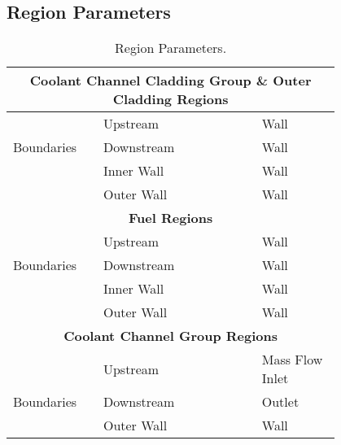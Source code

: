 \documentclass[8pt,a5paper]{article}
\begin{document}
\subsection*{Region Parameters}

\vspace{-0.25in}

\begin{table}[h!]
    \label{table: Table 5}
    \centering
    \small
    \caption{Region Parameters.}
    \begin{tabular}{|m{0.2\linewidth}|m{0.4\linewidth}|m{0.2\linewidth}|}
    \hline
    \multicolumn{3}{|c|}{\textbf{Coolant Channel Cladding Group \& Outer Cladding Regions}}\\\hline
    & Upstream & Wall\\\cline{2-3}
    Boundaries & Downstream & Wall\\\cline{2-3}
    & Inner Wall & Wall\\\cline{2-3}
    & Outer Wall & Wall\\\hline
    \multicolumn{3}{|c|}{\textbf{Fuel Regions}}\\\hline
    & Upstream & Wall\\\cline{2-3}
    Boundaries & Downstream & Wall\\\cline{2-3}
    & Inner Wall & Wall\\\cline{2-3}
    & Outer Wall & Wall\\\hline
    \multicolumn{3}{|c|}{\textbf{Coolant Channel Group Regions}}\\\hline
    & Upstream & Mass Flow Inlet\\\cline{2-3}
    Boundaries & Downstream & Outlet\\\cline{2-3}
    & Outer Wall & Wall\\\hline
    \end{tabular}
\end{table}
\end{document}
